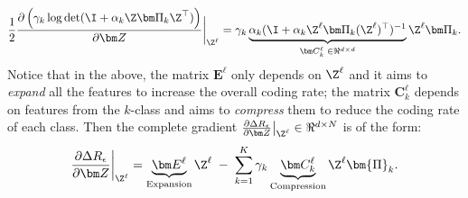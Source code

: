 \documentclass[../../book-main.tex]{subfiles}
\begin{document}
\begin{equation}\label{eqn:compress-directions}
\frac{1}{2}\frac{\partial \left( \gamma_{k}  \log \det (\I + \alpha_{k} \Z \bm \Pi_k \Z^{\top} )  \right)}{\partial \bm Z}\bigg|_{\Z^\ell} \\= \gamma_{k}  \underbrace{ \alpha_{k}  (\I +  \alpha_{k} \Z^\ell \bm \Pi_k (\Z^\ell)^{\top})^{-1}}_{\bm C^{\ell}_k \; \in \Re^{d\times d}} \Z^{\ell} \bm \Pi_k.
\end{equation}
Notice that in the above, the matrix $\bm E^{\ell}$  only depends on $\Z^{\ell}$ and it aims to {\em expand} all the features to increase the overall coding rate; the matrix $\bm C^{\ell}_{k}$ depends on features from the $k$-class and aims to {\em compress} them to reduce the coding rate of each class. 
Then the complete gradient $\frac{\partial \Delta R_{\epsilon}}{\partial \bm Z}\big|_{\Z^\ell} \in \Re^{d\times N}$ is of the  form:
\begin{equation}
\frac{\partial \Delta R_{\epsilon}}{\partial \bm Z}\bigg|_{\Z^\ell}  = \underbrace{\bm E^{\ell}}_{\text{Expansion}} \Z^{\ell} \;-\; \sum_{k=1}^K \gamma_{k} \underbrace{\bm C_{k}^{\ell}}_{\text{Compression}}  \Z^{\ell} \bm{\Pi}_k.
\label{eqn:DR-gradient}
\end{equation}
\end{document}
